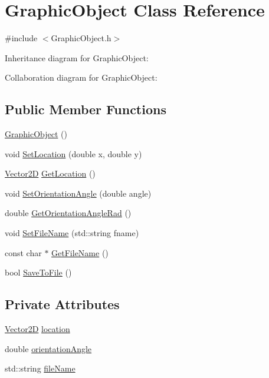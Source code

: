 \hypertarget{classGraphicObject}{}\section{Graphic\+Object Class Reference}
\label{classGraphicObject}


{\ttfamily \#include $<$Graphic\+Object.\+h$>$}



Inheritance diagram for Graphic\+Object\+:


Collaboration diagram for Graphic\+Object\+:
\subsection*{Public Member Functions}
\begin{DoxyCompactItemize}
\item 
\hyperlink{classGraphicObject_ae1b56ae4484ad120f5ba77c0b683a045}{Graphic\+Object} ()
\item 
void \hyperlink{classGraphicObject_a8dc588d1a3bd20ba79a9da1d651ec454}{Set\+Location} (double x, double y)
\item 
\hyperlink{Vector2D_8h_a2a0274942d24318d2654bd0f75c54fb7}{Vector2D} \hyperlink{classGraphicObject_adc2f473f234cedd0a512a4e1c41e3fa4}{Get\+Location} ()
\item 
void \hyperlink{classGraphicObject_a19bc9ba1759660382867ff151501f5a0}{Set\+Orientation\+Angle} (double angle)
\item 
double \hyperlink{classGraphicObject_a1f78c24074e454b60ed986a29722c1ff}{Get\+Orientation\+Angle\+Rad} ()
\item 
void \hyperlink{classGraphicObject_a0dfb2d11fad4237edb8653fd6df609e9}{Set\+File\+Name} (std\+::string fname)
\item 
const char $\ast$ \hyperlink{classGraphicObject_affe1401070f67eebcd2c6ba61ff8a275}{Get\+File\+Name} ()
\item 
bool \hyperlink{classGraphicObject_a2c68d0e1ae71d0d866455fa39f3d60ce}{Save\+To\+File} ()
\end{DoxyCompactItemize}
\subsection*{Private Attributes}
\begin{DoxyCompactItemize}
\item 
\hyperlink{Vector2D_8h_a2a0274942d24318d2654bd0f75c54fb7}{Vector2D} \hyperlink{classGraphicObject_a7739828cef90b4ab696b72a3ce28d280}{location}
\item 
double \hyperlink{classGraphicObject_a474fc4d1f4a67b9550ba85f454068659}{orientation\+Angle}
\item 
std\+::string \hyperlink{classGraphicObject_a72b2f9c3519e13279bd59f564fea7aa0}{file\+Name}
\end{DoxyCompactItemize}


